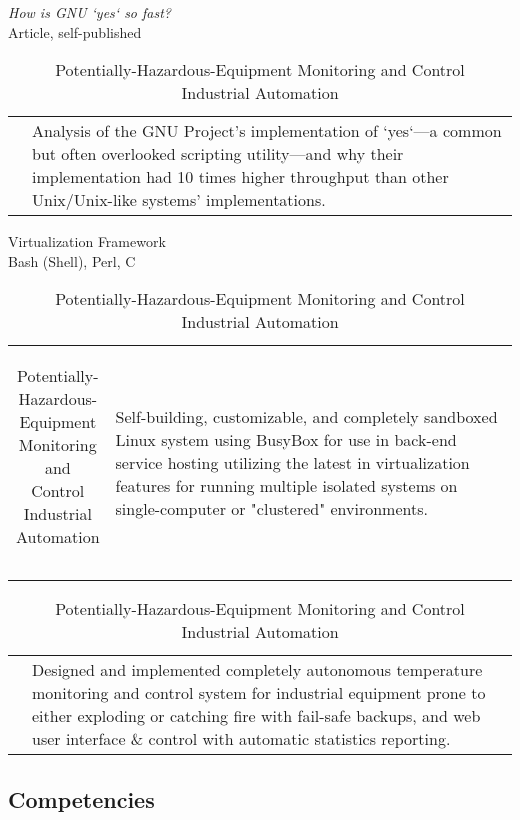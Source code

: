 \documentclass[letterpaper,]{article}
\begin{document}
\begin{table}[H]
	\centering
	\begin{minipage}[t]{0.30\linewidth}
		\centering
		\caption{
			\textit{How is GNU `yes` so fast?} \\ 
			\fontsize{8}{10}\selectfont Article, self-published
		}
		\begin{tabularx}{\textwidth}{r|X}
			&
			Analysis of the GNU Project's implementation of `yes`---a
			common but often overlooked scripting utility---and why
			their implementation had 10 times higher throughput
			than other Unix/Unix-like systems' implementations. \\
		\end{tabularx}
	\end{minipage}
	\hspace{0.03\linewidth}
	\begin{minipage}[t]{0.30\linewidth}
		\centering
		\caption{
			Virtualization Framework \\
			\fontsize{8}{10}\selectfont Bash (Shell), Perl, C
		}
		\begin{tabularx}{\textwidth}{r|X}
			\begin{tabular}{@{}r@{}}
			\end{tabular} & 
			Self-building, customizable, and completely sandboxed Linux 
			system using BusyBox for use in back-end service hosting
			utilizing the latest in virtualization features for running
			multiple isolated systems on single-computer or "clustered"
			environments.
		\end{tabularx}
	\end{minipage}
	\hspace{0.03\linewidth}
	\begin{minipage}[t]{0.30\linewidth}
		\centering
		\caption{
			Potentially-Hazardous-Equipment Monitoring and Control \\ 
			\fontsize{8}{10}\selectfont Industrial Automation
		}
		\begin{tabularx}{\textwidth}{r|X}
			&
			Designed and implemented completely autonomous 
			temperature monitoring and control system for industrial equipment 
			prone to either exploding or catching fire with fail-safe 
			backups, and web user interface \& control with automatic statistics 
			reporting. \\
		\end{tabularx}
	\end{minipage}
\end{table}

\subsection{Competencies}\label{competencies}
\end{document}
